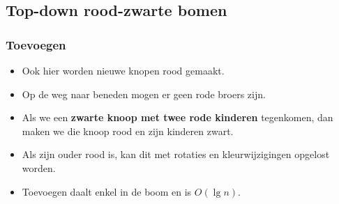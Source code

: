 \subsection{Top-down rood-zwarte bomen}
\subsubsection{Toevoegen}
\begin{itemize}
    \item Ook hier worden nieuwe knopen rood gemaakt.
    \item Op de weg naar beneden mogen er geen rode broers zijn.
    \item Als we een \textbf{zwarte knoop met twee rode kinderen} tegenkomen, dan maken we die knoop rood en zijn kinderen zwart.
    \item Als zijn ouder rood is, kan dit met rotaties en kleurwijzigingen opgelost worden.
    \item Toevoegen daalt enkel in de boom en is $O(\lg n)$.
\end{itemize}

